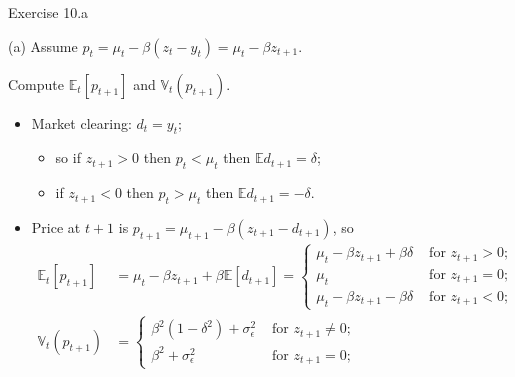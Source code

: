 \documentclass[english,10pt]{beamer}
\begin{document}
\begin{frame}{Exercise 10.a}
	\begin{exampleblock}{}
		(a) Assume $p_t = \mu_t - \beta(z_t - y_t) = \mu_t - \beta z_{t+1}$. 
		
		Compute $\mathbb{E}_t[p_{t+1}]$ and $\mathbb{V}_t(p_{t+1})$.
	\end{exampleblock}
	\pause
	\begin{itemize}
		\item Market clearing: $d_t = y_t$;
		\begin{itemize}
			\item so if $z_{t+1} > 0$ then $p_t < \mu_t$ then $\mathbb{E}d_{t+1} = \delta$;
			\item if $z_{t+1} < 0$ then $p_t > \mu_t$ then $\mathbb{E}d_{t+1} = -\delta$.
		\end{itemize}
		\item Price at $t+1$ is $p_{t+1} = \mu_{t+1} - \beta(z_{t+1} - d_{t+1})$, so
		\begin{align*}
			\mathbb{E}_t [p_{t+1}] &= \mu_t - \beta z_{t+1} + \beta \mathbb{E} [d_{t+1}] = 
			\begin{cases}
				\mu_t - \beta z_{t+1} + \beta \delta & \text{ for } z_{t+1} > 0;
				\\
				\mu_t & \text{ for } z_{t+1} = 0;
				\\
				\mu_t - \beta z_{t+1} - \beta \delta & \text{ for } z_{t+1} < 0;
			\end{cases}
			\\
			\mathbb{V}_t (p_{t+1}) &= 
			\begin{cases}
				\beta^2 (1-\delta^2) + \sigma_\epsilon^2 & \text{ for } z_{t+1} \neq 0;
				\\
				\beta^2 + \sigma_\epsilon^2 & \text{ for } z_{t+1} = 0;
			\end{cases}
		\end{align*}
	\end{itemize}
\end{frame}
\end{document}
